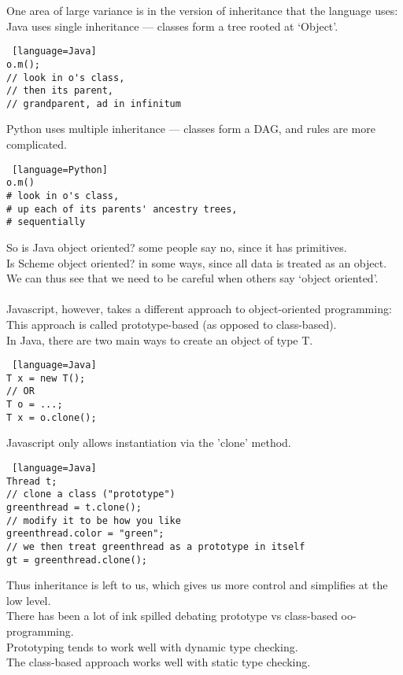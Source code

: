 \documentclass[../../lecture_notes.tex]{subfiles}
\begin{document}
One area of large variance is in the version of inheritance that the language uses:\\
\indent Java uses single inheritance — classes form a tree rooted at ‘Object’.
	\begin{lstlisting} [language=Java]
o.m(); 
// look in o's class, 
// then its parent, 
// grandparent, ad in infinitum
	\end{lstlisting}
\indent  Python uses multiple inheritance — classes form a DAG, and rules are more complicated.
	\begin{lstlisting} [language=Python]
o.m()
# look in o's class, 
# up each of its parents' ancestry trees, 
# sequentially
	\end{lstlisting}
So is Java object oriented? some people say no, since it has primitives.\\
Is Scheme object oriented? in some ways, since all data is treated as an object.\\
We can thus see that we need to be careful when others say ‘object oriented’.\\
\\
\noindent Javascript, however, takes a different approach to object-oriented programming:\\
\indent This approach is called prototype-based (as opposed to class-based).\\
\indent In Java, there are two main ways to create an object of type T.
	\begin{lstlisting} [language=Java]
T x = new T();
// OR
T o = ...;
T x = o.clone();
	\end{lstlisting}
	\indent \indent Javascript only allows instantiation via the 'clone' method.
	\begin{lstlisting} [language=Java]
Thread t;
// clone a class ("prototype")
greenthread = t.clone();
// modify it to be how you like
greenthread.color = "green";
// we then treat greenthread as a prototype in itself
gt = greenthread.clone();
	\end{lstlisting}
	\indent Thus inheritance is left to us, which gives us more control and simplifies at the low level.\\
There has been a lot of ink spilled debating prototype vs class-based oo-programming.\\
\indent Prototyping tends to work well with dynamic type checking.\\
\indent The class-based approach works well with static type checking.\\
\\
\end{document}
